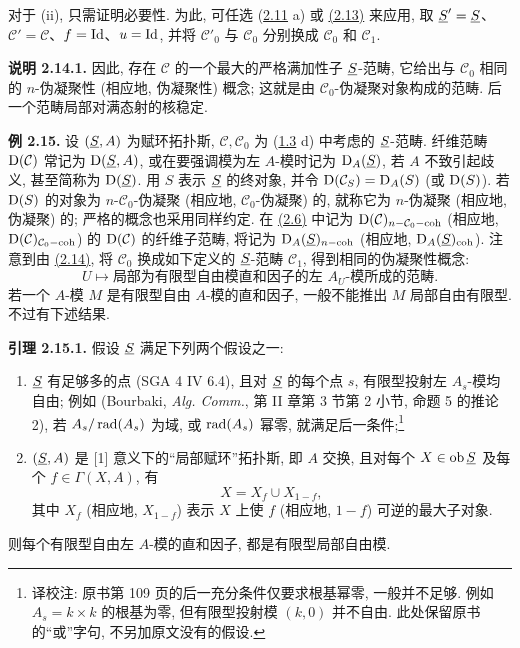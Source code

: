 对于 (ii), 只需证明必要性. 为此, 可任选 (\hyperlink{sga6.e01.prop.2-11}{2.11} a) 或 \hyperlink{sga6.e01.prop.2-13}{(2.13)} 来应用, 取 \(\underline S'=\underline S\)、\(\mathcal C'=\mathcal C\)、\(f=\operatorname{Id}\)、\(u=\operatorname{Id}\), 并将 \(\mathcal C'_0\) 与 \(\mathcal C_0\) 分别换成 \(\mathcal C_0\) 和 \(\mathcal C_1\).

\textbf{说明 2.14.1.} 因此, 存在 \(\mathcal C\) 的一个最大的严格满加性子 \(\underline S\)-范畴, 它给出与 \(\mathcal C_0\) 相同的 \(n\)-伪凝聚性 (相应地, 伪凝聚性) 概念; 这就是由 \(\mathcal C_0\)-伪凝聚对象构成的范畴. 后一个范畴局部对满态射的核稳定.

\textbf{例 2.15.} 设 \((\underline S,A)\) 为赋环拓扑斯, \(\mathcal C,\mathcal C_0\) 为 (\hyperlink{sga6.e01.sec.1.3}{1.3} d) 中考虑的 \(\underline S\)-范畴. 纤维范畴 \(\mathrm D(\mathcal C)\) 常记为 \(\mathrm D(\underline S,A)\), 或在要强调模为左 \(A\)-模时记为 \(\mathrm D_A(\underline S)\), 若 \(A\) 不致引起歧义, 甚至简称为 \(\mathrm D(\underline S)\). 用 \(S\) 表示 \(\underline S\) 的终对象, 并令 \(\mathrm D(\mathcal C_S)=\mathrm D_A(S)\) (或 \(\mathrm D(S)\)). 若 \(\mathrm D(S)\) 的对象为 \(n\)-\(\mathcal C_0\)-伪凝聚 (相应地, \(\mathcal C_0\)-伪凝聚) 的, 就称它为 \(n\)-伪凝聚 (相应地, 伪凝聚) 的; 严格的概念也采用同样约定. 在 \hyperlink{sga6.e01.schol.2-6}{(2.6)} 中记为 \(\mathrm D(\mathcal C)_{n-\mathcal C_0-\operatorname{coh}}\) (相应地, \(\mathrm D(\mathcal C)_{\mathcal C_0-\operatorname{coh}}\)) 的 \(\mathrm D(\mathcal C)\) 的纤维子范畴, 将记为 \(\mathrm D_A(\underline S)_{n-\operatorname{coh}}\) (相应地, \(\mathrm D_A(\underline S)_{\operatorname{coh}}\)). 注意到由 \hyperlink{sga6.e01.cor.2-14}{(2.14)}, 将 \(\mathcal C_0\) 换成如下定义的 \(\underline S\)-范畴 \(\mathcal C_1\), 得到相同的伪凝聚性概念:
\[
  U\longmapsto \text{局部为有限型自由模直和因子的左 }A_U\text{-模所成的范畴}.
\]
若一个 \(A\)-模 \(M\) 是有限型自由 \(A\)-模的直和因子, 一般不能推出 \(M\) 局部自由有限型. 不过有下述结果.

\textbf{引理 2.15.1.} 假设 \(\underline S\) 满足下列两个假设之一:
\begin{enumerate}[label=(\roman*)]
\item \(\underline S\) 有足够多的点 (SGA 4 IV 6.4), 且对 \(\underline S\) 的每个点 \(s\), 有限型投射左 \(A_s\)-模均自由; 例如 (Bourbaki, \emph{Alg. Comm.}, 第 II 章第 3 节第 2 小节, 命题 5 的推论 2), 若 \(A_s/\operatorname{rad}(A_s)\) 为域, 或 \(\operatorname{rad}(A_s)\) 幂零, 就满足后一条件;\footnote{译校注: 原书第 109 页的后一充分条件仅要求根基幂零, 一般并不足够. 例如 \(A_s=k\times k\) 的根基为零, 但有限型投射模 \((k,0)\) 并不自由. 此处保留原书的“或”字句, 不另加原文没有的假设.}
\item \((\underline S,A)\) 是 [1] 意义下的“局部赋环”拓扑斯, 即 \(A\) 交换, 且对每个 \(X\in\operatorname{ob}\underline S\) 及每个 \(f\in\Gamma(X,A)\), 有
\[
  X=X_f\cup X_{1-f},
\]
其中 \(X_f\) (相应地, \(X_{1-f}\)) 表示 \(X\) 上使 \(f\) (相应地, \(1-f\)) 可逆的最大子对象.
\end{enumerate}
则每个有限型自由左 \(A\)-模的直和因子, 都是有限型局部自由模.


